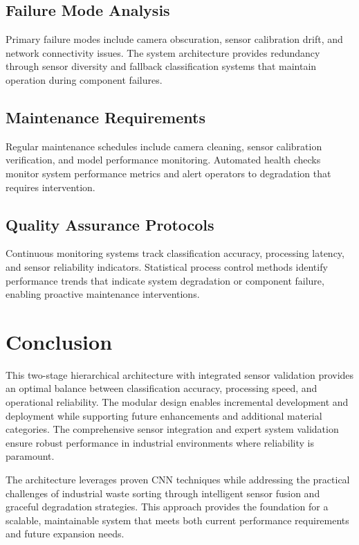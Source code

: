 \documentclass[11pt, a4paper]{article}
\begin{document}
\subsection{Failure Mode Analysis}
Primary failure modes include camera obscuration, sensor calibration drift, and network connectivity issues. The system architecture provides redundancy through sensor diversity and fallback classification systems that maintain operation during component failures.

\subsection{Maintenance Requirements}
Regular maintenance schedules include camera cleaning, sensor calibration verification, and model performance monitoring. Automated health checks monitor system performance metrics and alert operators to degradation that requires intervention.

\subsection{Quality Assurance Protocols}
Continuous monitoring systems track classification accuracy, processing latency, and sensor reliability indicators. Statistical process control methods identify performance trends that indicate system degradation or component failure, enabling proactive maintenance interventions.

\section{Conclusion}

This two-stage hierarchical architecture with integrated sensor validation provides an optimal balance between classification accuracy, processing speed, and operational reliability. The modular design enables incremental development and deployment while supporting future enhancements and additional material categories. The comprehensive sensor integration and expert system validation ensure robust performance in industrial environments where reliability is paramount.

The architecture leverages proven CNN techniques while addressing the practical challenges of industrial waste sorting through intelligent sensor fusion and graceful degradation strategies. This approach provides the foundation for a scalable, maintainable system that meets both current performance requirements and future expansion needs.
\end{document}
